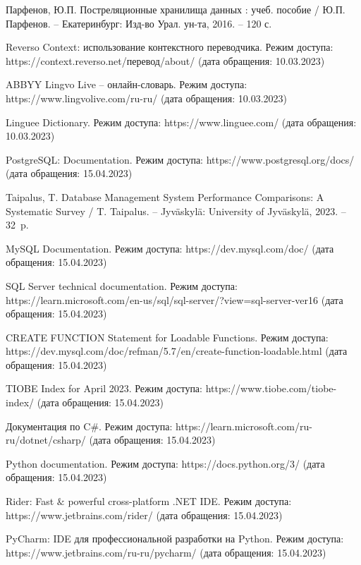 \begin{thebibliography}{}
	Парфенов, Ю.П. Постреляционные хранилища данных : учеб. пособие / Ю.П. Парфенов. -- Екатеринбург: Изд-во Урал. ун-та, 2016. -- 120 с.
    
    Reverso Context: использование контекстного переводчика. Режим доступа: https://context.reverso.net/перевод/about/ (дата обращения: 10.03.2023)
    
    ABBYY Lingvo Live -- онлайн-словарь. Режим доступа: https://www.lingvolive.com/ru-ru/ (дата обращения: 10.03.2023)
    
    Linguee Dictionary. Режим доступа: https://www.linguee.com/ (дата обращения: 10.03.2023)
    
    PostgreSQL: Documentation. Режим доступа: https://www.postgresql.org/docs/ (дата обращения: 15.04.2023)
    
    Taipalus, T. Database Management System Performance Comparisons: A Systematic Survey / T. Taipalus. -- Jyväskylä: University of Jyväskylä, 2023. -- 32~p.
    
    MySQL Documentation. Режим доступа: https://dev.mysql.com/doc/ (дата обращения: 15.04.2023)
    
    SQL Server technical documentation. Режим доступа: https://learn.microsoft.com/en-us/sql/sql-server/?view=sql-server-ver16 (дата обращения: 15.04.2023)
    
    CREATE FUNCTION Statement for Loadable Functions. Режим доступа: https://dev.mysql.com/doc/refman/5.7/en/create-function-loadable.html (дата обращения: 15.04.2023)
    
    TIOBE Index for April 2023. Режим доступа: https://www.tiobe.com/tiobe-index/ (дата обращения: 15.04.2023)
    
    Документация по C$\#$. Режим доступа: https://learn.microsoft.com/ru-ru/dotnet/csharp/ (дата обращения: 15.04.2023)
    
    Python documentation. Режим доступа: https://docs.python.org/3/ (дата обращения: 15.04.2023)
    
    Rider: Fast $\&$ powerful cross-platform .NET IDE. Режим доступа: https://www.jetbrains.com/rider/ (дата обращения: 15.04.2023)
    
    PyCharm: IDE для профессиональной разработки на Python. Режим доступа: https://www.jetbrains.com/ru-ru/pycharm/ (дата обращения: 15.04.2023)
    

\end{thebibliography}
